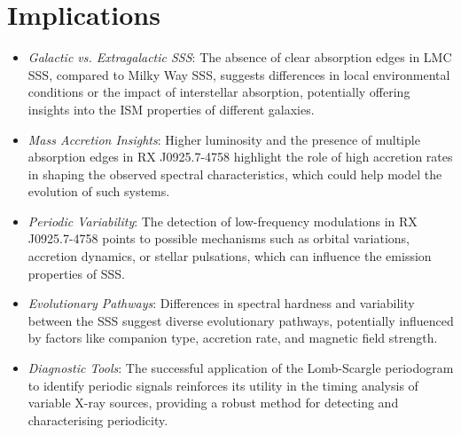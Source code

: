     \section{Implications}
    	\begin{itemize}
    		\item \textit{Galactic vs. Extragalactic SSS}: The absence of clear absorption edges in LMC SSS, compared to Milky Way SSS, suggests differences in local environmental conditions or the impact of interstellar absorption, potentially offering insights into the ISM properties of different galaxies.
    		
    		\item \textit{Mass Accretion Insights}: Higher luminosity and the presence of multiple absorption edges in RX J0925.7-4758 highlight the role of high accretion rates in shaping the observed spectral characteristics, which could help model the evolution of such systems.
    		
    		\item \textit{Periodic Variability}: The detection of low-frequency modulations in RX J0925.7-4758 points to possible mechanisms such as orbital variations, accretion dynamics, or stellar pulsations, which can influence the emission properties of SSS.
    		
    		\item \textit{Evolutionary Pathways}: Differences in spectral hardness and variability between the SSS suggest diverse evolutionary pathways, potentially influenced by factors like companion type, accretion rate, and magnetic field strength.
    		
    		\item \textit{Diagnostic Tools}: The successful application of the Lomb-Scargle periodogram to identify periodic signals reinforces its utility in the timing analysis of variable X-ray sources, providing a robust method for detecting and characterising periodicity.
    	\end{itemize}
    
